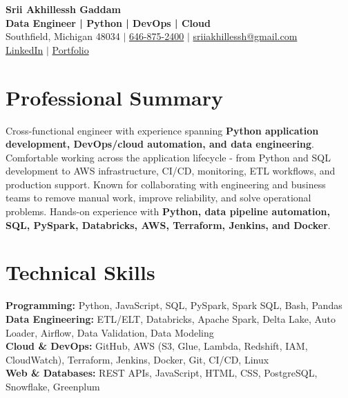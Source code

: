 \documentclass[letterpaper,10pt]{article}
\begin{document}
\fontsize{9.35pt}{10.45pt}\selectfont

\begin{center}
    {\LARGE \textbf{Srii Akhillessh Gaddam}} \\[-1pt]
    \textbf{Data Engineer | Python | DevOps | Cloud} \\[2pt]
    Southfield, Michigan 48034 $|$
    \href{tel:6468752400}{646-875-2400} $|$
    \href{mailto:sriiakhillessh@gmail.com}{sriiakhillessh@gmail.com} \\[1pt]
    \href{https://www.linkedin.com/in/srii-akhiilessh-gaddam-b48668191/}{LinkedIn} $|$
    \href{https://sriiakhillesshg.github.io/portfolio/}{Portfolio}
\end{center}
\vspace{-8pt}

\section{Professional Summary}
\small{Cross-functional engineer with experience spanning \textbf{Python application development, DevOps/cloud automation, and data engineering}. Comfortable working across the application lifecycle - from Python and SQL development to AWS infrastructure, CI/CD, monitoring, ETL workflows, and production support. Known for collaborating with engineering and business teams to remove manual work, improve reliability, and solve operational problems. Hands-on experience with \textbf{Python, data pipeline automation, SQL, PySpark, Databricks, AWS, Terraform, Jenkins, and Docker}.}

\section{Technical Skills}
\small{
\textbf{Programming:} Python, JavaScript, SQL, PySpark, Spark SQL, Bash, Pandas \\
\textbf{Data Engineering:} ETL/ELT, Databricks, Apache Spark, Delta Lake, Auto Loader, Airflow, Data Validation, Data Modeling \\
\textbf{Cloud \& DevOps:} GitHub, AWS (S3, Glue, Lambda, Redshift, IAM, CloudWatch), Terraform, Jenkins, Docker, Git, CI/CD, Linux \\
\textbf{Web \& Databases:} REST APIs, JavaScript, HTML, CSS, PostgreSQL, Snowflake, Greenplum
}

\end{document}
